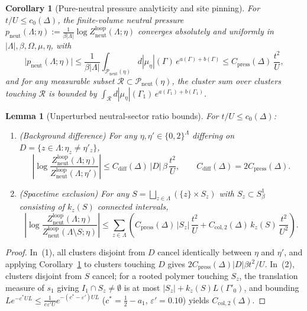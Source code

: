 \documentclass[11pt]{article}
\newtheorem{lemma}[theorem]{Lemma}
\newtheorem{corollary}[theorem]{Corollary}
\theoremstyle{definition}
\theoremstyle{remark}
\begin{document}
\begin{corollary}[Pure-neutral pressure analyticity and site pinning]
\label{cor:nd-press}
For $t/U \le c_0(\Delta)$, the finite-volume neutral pressure
$p_{\mathrm{neut}}(\Lambda; \eta) := \frac{1}{\beta |\Lambda|}\log Z_{\mathrm{neut}}^{\mathrm{loop}}(\Lambda; \eta)$
converges absolutely and uniformly in $|\Lambda|, \beta, \Omega, \mu, \eta$, with
\[
\bigl|p_{\mathrm{neut}}(\Lambda; \eta)\bigr|
\le \frac{1}{\beta |\Lambda|} \int_{\mathcal{P}_{\mathrm{neut}}(\eta)} d|\mu_\eta|(\Gamma)\, e^{a(\Gamma) + b(\Gamma)}
\le C_{\mathrm{press}}(\Delta)\,\frac{t^2}{U},
\]
and for any measurable subset $\mathcal{R} \subset \mathcal{P}_{\mathrm{neut}}(\eta)$,
the cluster sum over clusters touching $\mathcal{R}$ is bounded by
$\int_{\mathcal{R}} d|\mu_\eta|(\Gamma_1)\, e^{a(\Gamma_1) + b(\Gamma_1)}$.
\end{corollary}

\begin{lemma}[Unperturbed neutral-sector ratio bounds]
\label{lem:nd-ratios}
For $t/U \le c_0(\Delta)$:
\begin{enumerate}[leftmargin=1.5em]
\item \emph{(Background difference)} For any $\eta, \eta' \in \{0,2\}^\Lambda$
differing on $D = \{z \in \Lambda : \eta_z \ne \eta'_z\}$,
\[
\left|\log \frac{Z_{\mathrm{neut}}^{\mathrm{loop}}(\Lambda; \eta)}{Z_{\mathrm{neut}}^{\mathrm{loop}}(\Lambda; \eta')}\right|
\le C_{\mathrm{diff}}(\Delta)\, |D|\,\beta\,\frac{t^2}{U},
\qquad
C_{\mathrm{diff}}(\Delta) = 2 C_{\mathrm{press}}(\Delta).
\]
\item \emph{(Spacetime exclusion)} For any $S = \bigsqcup_{z\in\Lambda}(\{z\} \times S_z)$
with $S_z \subset S^1_\beta$ consisting of $k_z(S)$ connected intervals,
\[
\left|\log \frac{Z_{\mathrm{neut}}^{\mathrm{loop}}(\Lambda; \eta)}{Z_{\mathrm{neut}}^{\mathrm{loop}}(\Lambda \setminus S; \eta)}\right|
\le \sum_{z\in\Lambda} \left(C_{\mathrm{press}}(\Delta)\, |S_z|\,\frac{t^2}{U} + C_{\mathrm{col},2}(\Delta)\, k_z(S)\,\frac{t^2}{U^2}\right).
\]
\end{enumerate}
\end{lemma}

\begin{proof}
In~(1), all clusters disjoint from $D$ cancel identically between $\eta$ and
$\eta'$, and applying Corollary~\ref{cor:nd-press} to clusters touching $D$
gives $2 C_{\mathrm{press}}(\Delta)|D|\beta t^2/U$. In~(2), clusters disjoint
from $S$ cancel; for a rooted polymer touching $S_z$, the translation measure
of $s_1$ giving $I_1 \cap S_z \ne \emptyset$ is at most $|S_z| + k_z(S)L(\Gamma'_0)$,
and bounding $L e^{-c^* U L} \le \frac{1}{e\varepsilon' U} e^{-(c^*-\varepsilon')UL}$
($c^* = \frac{1}{2} - a_1$, $\varepsilon' = 0.10$) yields $C_{\mathrm{col},2}(\Delta)$.
\end{proof}
\end{document}
